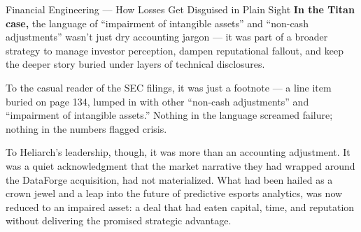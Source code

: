 \begin{HistoricalSidebar}{Financial Engineering --- How Losses Get Disguised in Plain Sight}
    \textbf{In the Titan case,} the language of “impairment of intangible assets” and “non-cash adjustments” wasn’t just dry accounting jargon —  
    it was part of a broader strategy to manage investor perception, dampen reputational fallout, and keep the deeper story buried under layers of technical disclosures.
    
\end{HistoricalSidebar}

\medskip 

To the casual reader of the SEC filings, it was just a footnote —
a line item buried on page 134, lumped in with other “non-cash adjustments” and “impairment of intangible assets.”
Nothing in the language screamed failure; nothing in the numbers flagged crisis.

To Heliarch’s leadership, though, it was more than an accounting adjustment.
It was a quiet acknowledgment that the market narrative they had wrapped around the DataForge acquisition, 
had not materialized.  What had been hailed as a crown jewel and a leap into the future of predictive 
esports analytics, was now reduced to an impaired asset: a deal that had eaten capital, time, and 
reputation without delivering the promised strategic advantage.

\medskip

